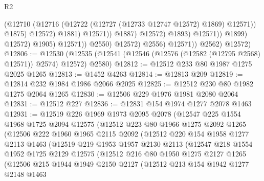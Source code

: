 \begin{lexlean}{R2}
\begin{coremodule}
                                              (@12710
                                                (@12716
                                                  (@12722
                                                    (@12727 (@12733 @12747 @12572) @1869)
                                                    @12571))
                                                @1875)
                                              @12572)
                                            @1881)
                                          @12571))
                                      @1887)
                                    @12572)
                                  @1893)
                                @12571))
                            @1899)
                          @12572)
                        @1905)
                      @12571))
                  @2550)
                @12572)
              @2556)
            @12571))
        @2562)
      @12572)
@12806 := @12530
    (@12535 (@12541 (@12546 (@12576 (@12582 (@12795 @2568) @12571)) @2574) @12572) @2580)
@12812 := @12512 @233 @80 @1987 @1275 @2025 @1265
@12813 := @1452 @4263
@12814 := @12813 @209
@12819 := @12814 @232 @1984 @1986 @2066 @2025
@12825 := @12512 @230 @80 @1982 @1275 @2064 @1265
@12830 := @12506 @229 @1976 @1981 @2080 @2064
@12831 := @12512 @227
@12836 := @12831 @154 @1974 @1277 @2078 @1463
@12931 := @12519
    @226
    @1969
    @1973
    @2095
    @2078
    (@12547
      @225
      @1554
      @1968
      @1725
      @2094
      @12575
      (@12512
        @223
        @80
        @1966
        @1275
        @2092
        @1265
        (@12506
          @222
          @1960
          @1965
          @2115
          @2092
          (@12512
            @220
            @154
            @1958
            @1277
            @2113
            @1463
            (@12519
              @219
              @1953
              @1957
              @2130
              @2113
              (@12547
                @218
                @1554
                @1952
                @1725
                @2129
                @12575
                (@12512
                  @216
                  @80
                  @1950
                  @1275
                  @2127
                  @1265
                  (@12506
                    @215
                    @1944
                    @1949
                    @2150
                    @2127
                    (@12512
                      @213
                      @154
                      @1942
                      @1277
                      @2148
                      @1463

\end{coremodule}
\end{lexlean}
